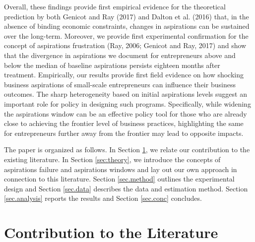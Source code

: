 \documentclass[11.5pt]{article}
\begin{document}
Overall, these findings provide first empirical evidence for the theoretical prediction by both Genicot and Ray (2017) and Dalton et al. (2016) that, in the absence of binding economic constraints, changes in aspirations can be sustained over the long-term. %
Moreover, we provide first experimental confirmation for the concept of aspirations frustration (Ray, 2006; Genicot and Ray, 2017) and show that the divergence in aspirations we document for entrepreneurs above and below the median of baseline aspirations persists eighteen months after treatment. Empirically, our results provide first field evidence on how shocking business aspirations of small-scale entrepreneurs can influence their business outcomes. The sharp heterogeneity based on initial aspirations levels suggest an important role for policy in designing such programs. Specifically, while widening the aspirations window can be an effective policy tool for those who are already close to achieving the frontier level of business practices, highlighting the same for entrepreneurs further away from the frontier may lead to opposite impacts. 

The paper is organized as follows. In Section \ref{sec:cont}, we relate our contribution to the existing literature. In Section \ref{sec:theory}, we introduce the concepts of aspirations failure and aspirations windows and lay out our own approach in connection to this literature. Section \ref{sec.method} outlines the experimental design and Section \ref{sec.data} describes the data and estimation method. Section \ref{sec.analysis} reports the results and Section \ref{sec.conc} concludes.

\section{Contribution to the Literature} \label{sec:cont}
 
\end{document}
